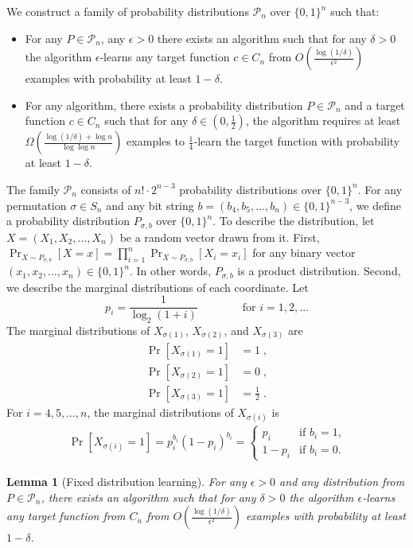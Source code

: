 \documentclass[12pt]{article}
\newtheorem{lemma}[proposition]{Lemma}
\renewcommand{\P}{\mathcal{P}}
\begin{document}
We construct a family of probability distributions $\P_n$ over $\{0,1\}^n$ such that:
\begin{itemize}
\item For any $P \in \P_n$, any $\epsilon > 0$ there exists an algorithm such
that for any $\delta > 0$ the algorithm $\epsilon$-learns any target function $c
\in C_n$ from $O \left( \frac{\log(1/\delta)}{\epsilon^2} \right)$ examples with
probability at least $1-\delta$.

\item For any algorithm, there exists
a probability distribution $P \in \P_n$ and a target function $c \in C_n$
such that for any $\delta \in (0,\frac{1}{2})$, the algorithm requires
at least $\Omega(\frac{\log(1/\delta) + \log n}{\log \log n})$ examples to
$\frac{1}{4}$-learn the target function with probability at least $1-\delta$.
\end{itemize}

The family $\P_n$ consists of $n! \cdot 2^{n-3}$ probability distributions over
$\{0,1\}^n$. For any permutation $\sigma \in S_n$ and any bit string $b = (b_4,
b_5, \dots, b_n) \in \{0,1\}^{n-3}$, we define a probability distribution
$P_{\sigma,b}$ over $\{0,1\}^n$. To describe the distribution, let $X = (X_1,
X_2, \dots, X_n)$ be a random vector drawn from it. First, $\Pr_{X \sim P_{\sigma,b}}[X = x] =
\prod_{i=1}^n \Pr_{X \sim P_{\sigma,b}}[X_i = x_i]$ for any binary vector $(x_1, x_2, \dots, x_n) \in
\{0,1\}^n$. In other words, $P_{\sigma,b}$ is a product distribution.
Second, we describe the marginal distributions of each coordinate. Let
$$
p_i = \frac{1}{\log_2(1 + i)} \qquad \qquad \text{for $i=1,2,\dots$}
$$
The marginal distributions of $X_{\sigma(1)}$, $X_{\sigma(2)}$,
and $X_{\sigma(3)}$ are
\begin{align*}
\Pr[X_{\sigma(1)} = 1] & = 1 \; , \\
\Pr[X_{\sigma(2)} = 1] & = 0 \; , \\
\Pr[X_{\sigma(3)} = 1] & = \tfrac{1}{2} \; .
\end{align*}
For $i=4,5,\dots,n$, the marginal distributions of $X_{\sigma(i)}$ is
\begin{align*}
\Pr[X_{\sigma(i)} = 1] = p_i^{b_i} (1 - p_i)^{b_i} =
\begin{cases}
p_i & \text{if $b_i = 1$,} \\
1 - p_i & \text{if $b_i = 0$.}
\end{cases}
\end{align*}

\begin{lemma}[Fixed distribution learning]
For any $\epsilon > 0$ and any distribution from $P \in \P_n$,
there exists an algorithm such that for any $\delta > 0$
the algorithm $\epsilon$-learns any target function
from $C_n$ from $O \left( \frac{\log(1/\delta)}{\epsilon^2} \right)$
examples with probability at least $1 - \delta$.
\end{lemma}
\end{document}
